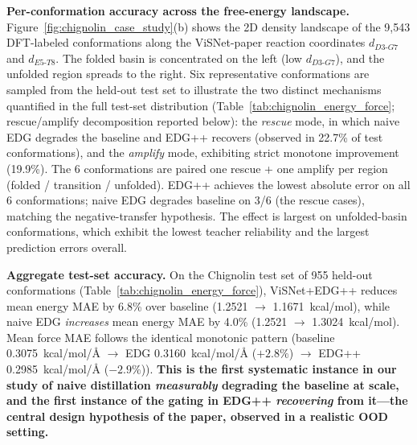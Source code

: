 \textbf{Per-conformation accuracy across the free-energy landscape.} Figure~\ref{fig:chignolin_case_study}(b) shows the 2D density landscape of the 9{,}543 DFT-labeled conformations along the ViSNet-paper reaction coordinates $d_{D3\text{-}G7}$ and $d_{E5\text{-}T8}$. The folded basin is concentrated on the left (low $d_{D3\text{-}G7}$), and the unfolded region spreads to the right. Six representative conformations are sampled from the held-out test set to illustrate the two distinct mechanisms quantified in the full test-set distribution (Table~\ref{tab:chignolin_energy_force}; rescue/amplify decomposition reported below): the \emph{rescue} mode, in which naive EDG degrades the baseline and EDG++ recovers (observed in 22.7\% of test conformations), and the \emph{amplify} mode, exhibiting strict monotone improvement (19.9\%). The 6 conformations are paired one rescue + one amplify per region (folded / transition / unfolded). EDG++ achieves the lowest absolute error on all 6 conformations; naive EDG degrades baseline on 3/6 (the rescue cases), matching the negative-transfer hypothesis. The effect is largest on unfolded-basin conformations, which exhibit the lowest teacher reliability and the largest prediction errors overall.

\textbf{Aggregate test-set accuracy.} On the Chignolin test set of 955 held-out conformations (Table~\ref{tab:chignolin_energy_force}), ViSNet+EDG++ reduces mean energy MAE by 6.8\% over baseline (1.2521 $\rightarrow$ 1.1671~kcal/mol), while naive EDG \emph{increases} mean energy MAE by 4.0\% (1.2521 $\rightarrow$ 1.3024~kcal/mol). Mean force MAE follows the identical monotonic pattern (baseline \SI{0.3075}{kcal/mol/\angstrom} $\to$ EDG \SI{0.3160}{kcal/mol/\angstrom} ($+\!2.8\%$) $\to$ EDG++ \SI{0.2985}{kcal/mol/\angstrom} ($-\!2.9\%$)). %
\textbf{This is the first systematic instance in our study of naive distillation \emph{measurably} degrading the baseline at scale, and the first instance of the gating in EDG++ \emph{recovering} from it---the central design hypothesis of the paper, observed in a realistic OOD setting.}

